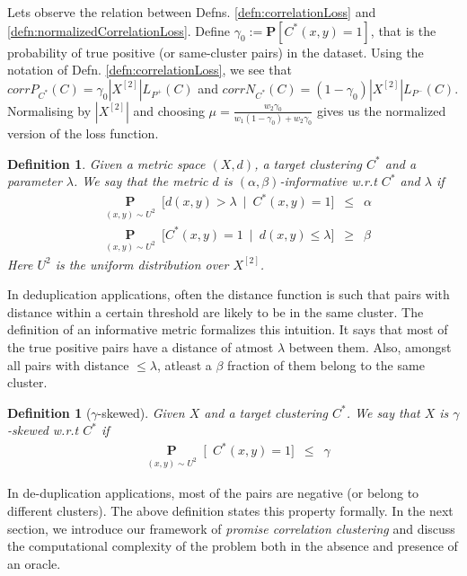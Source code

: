 \documentclass[12pt]{article}
\newtheorem{definition}[theorem]{Definition}
\newcommand{\mb}{\mathbf}
\begin{document}
Lets observe the relation between Defns. \ref{defn:correlationLoss} and \ref{defn:normalizedCorrelationLoss}. Define $\gamma_0 := \mb P[C^*(x, y) = 1]$, that is the probability of true positive (or same-cluster pairs) in the dataset. Using the notation of Defn. \ref{defn:correlationLoss}, we see that $corrP_{C^*}(C) = \gamma_0|X^{[2]}| L_{P^+}(C)$ and $corrN_{C^*}(C) = (1-\gamma_0)|X^{[2]}| L_{P^-}(C)$. Normalising by $|X^{[2]}|$ and choosing $\mu = \frac{w_2 \gamma_0}{w_1 (1-\gamma_0) + w_2 \gamma_0}$ gives us the normalized version of the loss function.

\begin{definition}
\label{defn:informativeMetric}
Given a metric space $(X, d)$, a target clustering $C^*$ and a parameter $\lambda$. We say that the metric $d$ is $(\alpha, \beta)$-informative w.r.t $C^*$ and $\lambda$ if
\begin{align}
	&\underset{(x, y) \sim U^2}{\mb P}\enspace \big[d(x, y) > \lambda \enspace|\enspace C^*(x, y) = 1\big] \enspace \le \enspace \alpha \label{eqn:alphaInformative}\\
	&\underset{(x, y) \sim U^2}{\mb P}\enspace \big[C^*(x, y) = 1 \enspace|\enspace d(x, y) \le \lambda \big] \enspace \ge \enspace \beta \label{eqn:betaInformative}
\end{align}
Here $U^2$ is the uniform distribution over $X^{[2]}$. 
\end{definition} 
In deduplication applications, often the distance function is such that pairs with distance within a certain threshold are likely to be in the same cluster. The definition of an informative metric formalizes this intuition. It says that most of the true positive pairs have a distance of atmost $\lambda$ between them. Also, amongst all pairs with distance $\le \lambda$, atleast a $\beta$ fraction of them belong to the same cluster. 

\begin{definition}[$\gamma$-skewed] 
\label{defn:gammaskewed} 
Given $X$ and a target clustering $C^*$. We say that $X$ is $\gamma$-skewed w.r.t $C^*$ if 
\begin{align*}
	&\underset{(x, y) \sim U^2}{\mb P}\enspace \big[\enspace C^*(x, y) = 1 \big] \enspace \le \enspace \gamma
\end{align*}
\end{definition}
In de-duplication applications, most of the pairs are negative (or belong to different clusters). The above definition states this property formally. In the next section, we introduce our framework of \textit{promise correlation clustering} and discuss the computational complexity of the problem both in the absence and presence of an oracle.   
\end{document}
